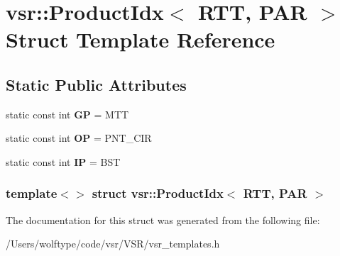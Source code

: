 \hypertarget{structvsr_1_1_product_idx_3_01_r_t_t_00_01_p_a_r_01_4}{\section{vsr\-:\-:Product\-Idx$<$ R\-T\-T, P\-A\-R $>$ Struct Template Reference}
\label{structvsr_1_1_product_idx_3_01_r_t_t_00_01_p_a_r_01_4}
}
\subsection*{Static Public Attributes}
\begin{DoxyCompactItemize}
\item 
\hypertarget{structvsr_1_1_product_idx_3_01_r_t_t_00_01_p_a_r_01_4_a66dec0de2080e4522be6ae69034e0d54}{static const int {\bfseries G\-P} = M\-T\-T}\label{structvsr_1_1_product_idx_3_01_r_t_t_00_01_p_a_r_01_4_a66dec0de2080e4522be6ae69034e0d54}

\item 
\hypertarget{structvsr_1_1_product_idx_3_01_r_t_t_00_01_p_a_r_01_4_a0347bd066129afaf9164692682f341f4}{static const int {\bfseries O\-P} = P\-N\-T\-\_\-\-C\-I\-R}\label{structvsr_1_1_product_idx_3_01_r_t_t_00_01_p_a_r_01_4_a0347bd066129afaf9164692682f341f4}

\item 
\hypertarget{structvsr_1_1_product_idx_3_01_r_t_t_00_01_p_a_r_01_4_aeb324068b3fa349c6c9adb7aa58097bd}{static const int {\bfseries I\-P} = B\-S\-T}\label{structvsr_1_1_product_idx_3_01_r_t_t_00_01_p_a_r_01_4_aeb324068b3fa349c6c9adb7aa58097bd}

\end{DoxyCompactItemize}
\subsubsection*{template$<$$>$ struct vsr\-::\-Product\-Idx$<$ R\-T\-T, P\-A\-R $>$}



The documentation for this struct was generated from the following file\-:\begin{DoxyCompactItemize}
\item 
/\-Users/wolftype/code/vsr/\-V\-S\-R/vsr\-\_\-templates.\-h\end{DoxyCompactItemize}

